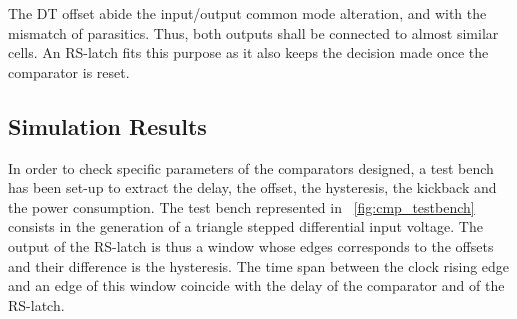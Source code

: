 The DT offset abide the input/output common mode alteration, and with the mismatch of parasitics. Thus, both outputs shall be connected to almost similar cells. An RS-latch fits this purpose as it also keeps the decision made once the comparator is reset.

    \subsection{Simulation Results}              %
\label{sec:latches_sim}
In order to check specific parameters of the comparators designed, a test bench has been set-up to extract the delay, the offset, the hysteresis, the kickback and the power consumption. The test bench represented in \figurename~\ref{fig:cmp_testbench} consists in the generation of a triangle stepped differential input voltage. The output of the RS-latch is thus a window whose edges corresponds to the offsets and their difference is the hysteresis. The time span between the clock rising edge and an edge of this window coincide with the delay of the comparator and of the RS-latch. 

